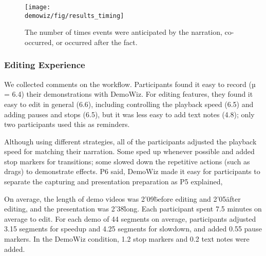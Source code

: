 \begin{figure*}[t]
  \centering
  \texttt{[image: \\demowiz/fig/results\_timing]}
  \caption{The number of times events were anticipated by the narration, co-occurred, or occurred after the fact.}
  \label{fig:demowiz_results_timing}
\end{figure*}

\subsubsection{Editing Experience}
We collected comments on the workflow. Participants found it easy to record (µ = 6.4) their demonstrations with DemoWiz. For editing features, they found it easy to edit in general (6.6), including controlling the playback speed (6.5) and adding pauses and stops (6.5), but it was less easy to add text notes (4.8); only two participants used this as reminders.

Although using different strategies, all of the participants adjusted the playback speed for matching their narration. Some sped up whenever possible and added stop markers for transitions; some slowed down the repetitive actions (such as drags) to demonstrate effects. P6 said,  DemoWiz made it easy for participants to separate the capturing and presentation preparation as P5 explained, 

On average, the length of demo videos was 2'09\" before editing and 2'05\" after editing, and the presentation was 2'38\" long. Each participant spent 7.5 minutes on average to edit. For each demo of 44 segments on average, participants adjusted 3.15 segments for speedup and 4.25 segments for slowdown, and added 0.55 pause markers. In the DemoWiz condition, 1.2 stop markers and 0.2 text notes were added.
